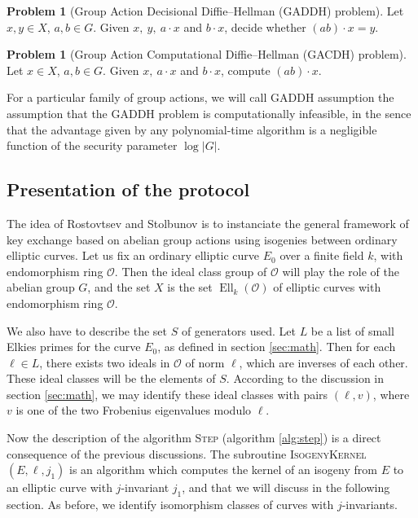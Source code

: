 \documentclass{article}
\renewcommand{\O}{\mathcal{O}}
\newcommand{\algnamestyle}[1]{\textsc{#1}}
\theoremstyle{definition}
\newtheorem{prob}[theorem]{Problem}
\DeclareMathOperator{\Ell}{Ell}
\begin{document}
\begin{prob}[Group Action Decisional Diffie--Hellman (GADDH) problem] Let $x, y\in X$,
$a, b\in G$. Given $x,\ y,\ a\cdot x$ and $b\cdot x$, decide whether $(ab)\cdot x = y$.
\end{prob}

\begin{prob}[Group Action Computational Diffie--Hellman (GACDH) problem] Let $x\in X$,
$a, b\in G$. Given $x,\ a\cdot x$ and $b\cdot x$, compute $(ab)\cdot x$.
\end{prob}

For a particular family of group actions, we will call GADDH assumption the assumption
that the GADDH problem is computationally infeasible, in the sence that the advantage
given by any polynomial-time algorithm is a negligible function of the security parameter
$\log|G|$.

\subsection{Presentation of the protocol}

The idea of Rostovtsev and Stolbunov is to instanciate the general framework of
key exchange based on abelian group actions using isogenies between ordinary elliptic
curves. Let us fix an ordinary elliptic curve $E_0$ over a finite field $k$, with
endomorphism ring $\O$. Then the ideal class group of $\O$ will play the role of
the abelian group $G$, and the set $X$ is the set $\Ell_k(\O)$ of elliptic curves
with endomorphism ring $\O$.

We also have to describe the set $S$ of generators used. Let $L$ be a list of
small Elkies primes for the curve $E_0$, as defined in section \ref{sec:math}.
Then for each $\ell\in L$, there exists two ideals in $\O$ of norm $\ell$, which
are inverses of each other. These ideal classes will be the elements of $S$. According to
the discussion in section \ref{sec:math}, we may identify these ideal classes with
pairs $(\ell, v)$, where $v$ is one of the two Frobenius eigenvalues modulo $\ell$.

Now the description of the algorithm \algnamestyle{Step} (algorithm \ref{alg:step}) is a direct consequence of
the previous discussions. The subroutine \algnamestyle{IsogenyKernel}$(E, \ell, j_1)$
is an algorithm which computes the kernel of an isogeny from $E$ to an elliptic curve
with $j$-invariant $j_1$, and that we will discuss in the following section.
As before, we identify isomorphism classes of curves with
$j$-invariants.
\end{document}
